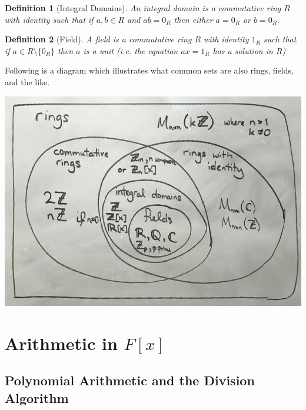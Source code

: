 \documentclass{article}
\theoremstyle{break}
\newtheorem{definition}{Definition}[subsection]
\begin{document}
\begin{definition}[Integral Domains]
  An integral domain is a commutative ring $R$ with identity such that if $a, b
  \in R$ and $ab = 0_R$ then either $a = 0_R$ or $b = 0_R$.
\end{definition}

\begin{definition}[Field]
  A field is a commutative ring $R$ with identity $1_R$ such that if $a \in R
  \setminus \{0_R\}$ then $a$ is a unit (i.e. the equation $ax = 1_R$ has a
  solution in $R$)
\end{definition}

Following is a diagram which illustrates what common sets are also rings,
fields, and the like.

\includegraphics[width=\linewidth]{ring-venn-diagram.jpg}

\section{Arithmetic in $F[x]$}
\subsection{Polynomial Arithmetic and the Division Algorithm}
\end{document}
